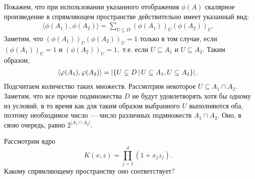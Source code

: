 \documentclass[12pt,fleqn]{article}
\begin{document}
\begin{esSolution}
	Покажем, что при использовании указанного отображения $\phi(A)$ скалярное произведение в спрямляющем пространстве действительно имеет указанный вид:
	\begin{align*}
		\langle \phi(A_1), \phi(A_2) \rangle = 
		\sum_{U \subseteq D} \left(\phi(A_1) \right)_U \left(\phi(A_2) \right)_U.
	\end{align*}
	Заметим, что $ \left(\phi(A_1) \right)_U \left(\phi(A_2) \right)_U = 1$ только в том случае, если $ \left(\phi(A_1) \right)_U = 1$ и $ \left(\phi(A_2) \right)_U = 1,$ т.е. если $U \subseteq A_1$ и $U \subseteq A_2.$ Таким образом,
	\begin{align*}
		\langle \varphi(A_1), \varphi(A_2) \rangle = 
		\left| \{ U \subseteq D \mspace{3mu}{|}\mspace{3mu} U \subseteq A_1, U \subseteq A_2 \} \right|.
	\end{align*}
	Подсчитаем количество таких множеств. Рассмотрим некоторое $U \subseteq A_1 \cap A_2.$ Заметим, что все прочие подмножества $D$ не будут удовлетворять хотя бы одному из условий, в то время как для таким образом выбранного $U$ выполняются оба, поэтому необходимое число — число различных подмножеств $A_1 \cap A_2.$ Оно, в свою очередь, равно $2^{\left| A_1 \cap A_2 \right|}.$
\end{esSolution}

\begin{vkProblem}
	Рассмотрим ядро
	$$K(x, z) = \prod_{j=1}^d (1+x_j z_j).$$
	Какому спрямляющему пространству оно соответствует?
\end{vkProblem}
\end{document}
